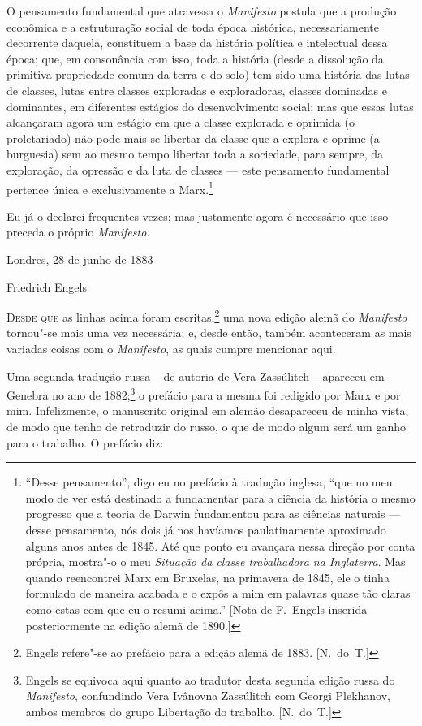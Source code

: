 O pensamento fundamental que atravessa o
\textit{Manifesto} postula que a produção econômica e
a estruturação social de toda época histórica, necessariamente
decorrente daquela, constituem a base da história política e
intelectual dessa época; que, em consonância com isso, toda a história
(desde a dissolução da primitiva propriedade comum da terra e do solo)
tem sido uma história das lutas de classes, lutas entre classes
exploradas e exploradoras, classes dominadas e dominantes, em
diferentes estágios do desenvolvimento social; mas que essas lutas
alcançaram agora um estágio em que a classe explorada e oprimida (o
proletariado) não pode mais se libertar da classe que a explora e
oprime (a burguesia) sem ao mesmo tempo libertar toda a sociedade, para
sempre, da exploração, da opressão e da luta de classes --- este
pensamento fundamental pertence única e exclusivamente a
Marx.\footnote{ “Desse pensamento”, digo eu no prefácio à tradução inglesa, \EP[]
“que no meu modo de ver está destinado a fundamentar para a ciência da 
história o mesmo progresso que a teoria de Darwin fundamentou para as 
ciências naturais  ---  desse pensamento, nós dois já nos havíamos paulatinamente 
aproximado alguns anos antes de 1845. Até que ponto eu avançara nessa direção 
por conta própria, mostra"-o o meu \textit{Situação da classe
trabalhadora na Inglaterra}. Mas quando reencontrei Marx em Bruxelas,
na primavera de 1845, ele o tinha formulado de maneira acabada e o
expôs a mim em palavras quase tão claras como estas com que eu o resumi
acima.” [Nota de F.~Engels inserida posteriormente na edição alemã de
1890.]}

Eu já o declarei frequentes vezes; mas justamente agora é necessário que
isso preceda o próprio \mbox{\textit{Manifesto}}.
\smallskip

\hfill Londres, 28 de junho de 1883

\hfill Friedrich Engels


\textsc{Desde que} as linhas acima foram escritas,\footnote{ Engels refere"-se
ao prefácio para a edição alemã de 1883. [N.~do~T.]}  uma nova
edição alemã do \textit{Manifesto} tornou"-se mais uma vez necessária;
e, desde então, também aconteceram as mais variadas coisas com o
\textit{Manifesto}, as quais cumpre mencionar aqui. 

Uma segunda tradução russa – de autoria de Vera Zassúlitch – apareceu
em Genebra no ano de 1882;\footnote{ Engels se equivoca aqui quanto ao
tradutor desta segunda edição russa do \textit{Manifesto}, confundindo
Vera Ivânovna Zassúlitch com Georgi Plekhanov, ambos membros do grupo
Libertação do trabalho. [N.~do~T.]}  o prefácio para a
mesma foi redigido por Marx e por mim. Infelizmente, o manuscrito
original em alemão desapareceu de minha vista, de modo que tenho de
retraduzir do russo, o que de modo algum será um ganho para o trabalho.
O prefácio diz:

